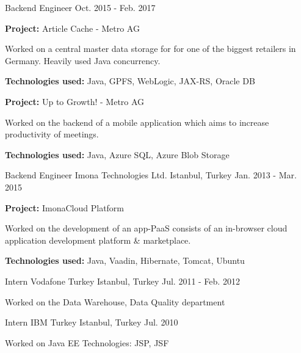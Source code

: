 \begin{cventries}
    \cventry
    {Backend Engineer}
    {}
    {}
    {Oct. 2015 - Feb. 2017}
    {
    \begin{cvitems}
        \item {\textbf{Project:} Article Cache - Metro AG}
        \item {
        Worked on a central master data storage for for one of the biggest retailers in Germany.
        Heavily used Java concurrency.
        }
        \smallskip
        \item {\textbf{Technologies used:} Java, GPFS, WebLogic, JAX-RS, Oracle DB}
        \medskip
        \item {\textbf{Project:} Up to Growth! - Metro AG}
        \item {
        Worked on the backend of a mobile application which aims to increase productivity of
        meetings.
        }
        \smallskip
        \item {\textbf{Technologies used:} Java, Azure SQL, Azure Blob Storage}
    \end{cvitems}
    }

    \cventry
    {Backend Engineer}
    {Imona Technologies Ltd.}
    {Istanbul, Turkey}
    {Jan. 2013 - Mar. 2015}
    {
    \begin{cvitems}
        \item {\textbf{Project:} ImonaCloud Platform}
        \newline
        \item {
        Worked on the development of an app-PaaS consists of an in-browser cloud
        application development platform \& marketplace.
        }
        \smallskip
        \item {\textbf{Technologies used:} Java, Vaadin, Hibernate, Tomcat, Ubuntu}
    \end{cvitems}
    }

    \cventry
    {Intern}
    {Vodafone Turkey}
    {Istanbul, Turkey}
    {Jul. 2011 - Feb. 2012}
    {
    \begin{cvitems}
        \item {Worked on the Data Warehouse, Data Quality department}
    \end{cvitems}
    }

    \cventry
    {Intern}
    {IBM Turkey}
    {Istanbul, Turkey}
    {Jul. 2010}
    {
    \begin{cvitems}
        \item {Worked on Java EE Technologies: JSP, JSF}
    \end{cvitems}
    }

\end{cventries}
